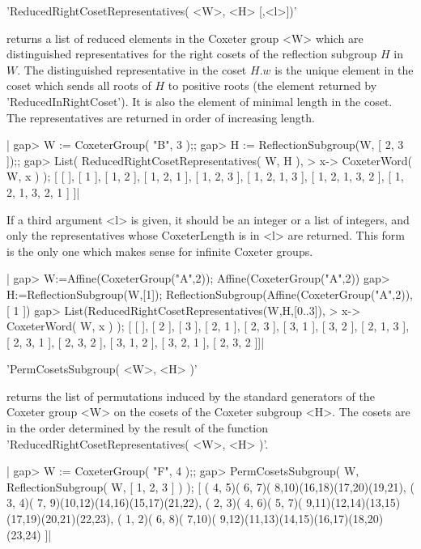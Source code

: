 'ReducedRightCosetRepresentatives( <W>, <H> [,<l>])'

returns a  list of reduced elements  in the Coxeter group  <W> which are
distinguished  representatives for  the right  cosets of  the reflection
subgroup $H$ in $W$. The distinguished representative in the coset $H.w$
is the  unique element  in the  coset which  sends all  roots of  $H$ to
positive roots  (the element  returned by 'ReducedInRightCoset').  It is
also the element of minimal length in the coset. The representatives are
returned in order of increasing length.

|    gap> W := CoxeterGroup( "B", 3 );;
    gap> H := ReflectionSubgroup(W, [ 2, 3 ]);;
    gap> List( ReducedRightCosetRepresentatives( W, H ),
    >                                x-> CoxeterWord( W, x ) );
    [ [  ], [ 1 ], [ 1, 2 ], [ 1, 2, 1 ], [ 1, 2, 3 ], [ 1, 2, 1, 3 ],
      [ 1, 2, 1, 3, 2 ], [ 1, 2, 1, 3, 2, 1 ] ]|

If  a third argument  <l> is given,  it should be  an integer or  a list of
integers,  and only the  representatives whose CoxeterLength  is in <l> are
returned.  This form is the only one which makes sense for infinite Coxeter
groups.

|    gap> W:=Affine(CoxeterGroup("A",2));
    Affine(CoxeterGroup("A",2))
    gap> H:=ReflectionSubgroup(W,[1]);
    ReflectionSubgroup(Affine(CoxeterGroup("A",2)), [ 1 ])
    gap> List(ReducedRightCosetRepresentatives(W,H,[0..3]),
    >                                x-> CoxeterWord( W, x ) );
    [ [  ], [ 2 ], [ 3 ], [ 2, 1 ], [ 2, 3 ], [ 3, 1 ], [ 3, 2 ],
      [ 2, 1, 3 ], [ 2, 3, 1 ], [ 2, 3, 2 ], [ 3, 1, 2 ], [ 3, 2, 1 ],
      [ 2, 3, 2 ]]|


'PermCosetsSubgroup( <W>, <H> )'

returns the  list of permutations induced  by  the standard generators of
the Coxeter  group <W> on  the cosets of the Coxeter  subgroup  <H>.  The
cosets  are  in the   order determined by   the  result of   the function
'ReducedRightCosetRepresentatives( <W>, <H> )'.

|    gap> W := CoxeterGroup( "F", 4 );;
    gap> PermCosetsSubgroup( W, ReflectionSubgroup( W, [ 1, 2, 3 ] ) );
    [ ( 4, 5)( 6, 7)( 8,10)(16,18)(17,20)(19,21),
      ( 3, 4)( 7, 9)(10,12)(14,16)(15,17)(21,22),
      ( 2, 3)( 4, 6)( 5, 7)( 9,11)(12,14)(13,15)(17,19)(20,21)(22,23),
      ( 1, 2)( 6, 8)( 7,10)( 9,12)(11,13)(14,15)(16,17)(18,20)(23,24) ]|

